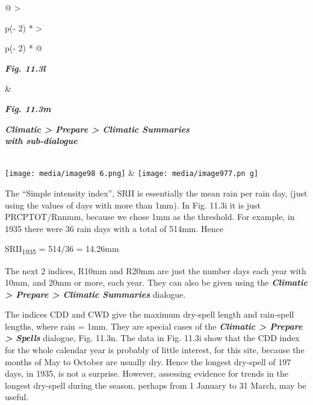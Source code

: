 \documentclass[
  letterpaper,
  DIV=11,
  numbers=noendperiod]{scrreprt}
\begin{document}
\begin{longtable}[]{@{}
  >{\raggedright\arraybackslash}p{(\columnwidth - 2\tabcolsep) * }
  >{\raggedright\arraybackslash}p{(\columnwidth - 2\tabcolsep) * }@{}}
\toprule\noalign{}
\begin{minipage}[b]{\linewidth}\raggedright
\textbf{\emph{Fig. 11.3l}}
\end{minipage} & \begin{minipage}[b]{\linewidth}\raggedright
\textbf{\emph{Fig. 11.3m}}

\textbf{\emph{Climatic \textgreater{} Prepare \textgreater{} Climatic
Summaries\\
with sub-dialogue}}\strut
\end{minipage} \\
\midrule\noalign{}
\endhead
\bottomrule\noalign{}
\endlastfoot
\texttt{[image: media/image98 6.png]}
&
\texttt{[image: media/image977.pn g]} \\
\end{longtable}

The ``Simple intensity index'', SRII is essentially the mean rain per
rain day, (just using the values of days with more than 1mm). In Fig.
11.3i it is just PRCPTOT/Rnnmm, because we chose 1mm as the threshold.
For example, in 1935 there were 36 rain days with a total of 514mm.
Hence

SRII\textsubscript{1935} = 514/36 = 14.26mm

The next 2 indices, R10mm and R20mm are just the number days each year
with 10mm, and 20mm or more, each year. They can also be given using the
\textbf{\emph{Climatic \textgreater{} Prepare \textgreater{} Climatic
Summaries}} dialogue.

The indices CDD and CWD give the maximum dry-spell length and rain-spell
lengths, where rain = 1mm. They are special cases of the
\textbf{\emph{Climatic \textgreater{} Prepare \textgreater{} Spells}}
dialogue, Fig. 11.3n. The data in Fig. 11.3i show that the CDD index for
the whole calendar year is probably of little interest, for this site,
because the months of May to October are usually dry. Hence the longest
dry-spell of 197 days, in 1935, is not a surprise. However, assessing
evidence for trends in the longest dry-spell during the season, perhaps
from 1 January to 31 March, may be useful.
\end{document}
